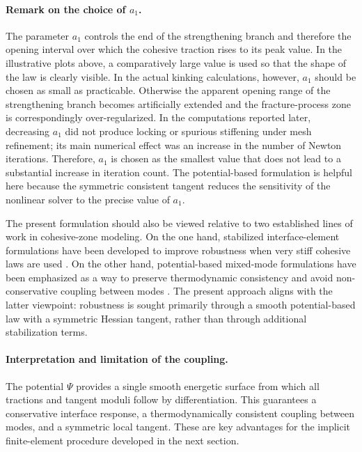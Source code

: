 \documentclass[smallextended]{svjour3}       %
\begin{document}
\paragraph{Remark on the choice of \texorpdfstring{$a_1$}{a1}.}
The parameter \(a_1\) controls the end of the strengthening branch and
therefore the opening interval over which the cohesive traction rises to its
peak value. In the illustrative plots above, a comparatively large value is
used so that the shape of the law is clearly visible. In the actual kinking
calculations, however, \(a_1\) should be chosen as small as practicable.
Otherwise the apparent opening range of the strengthening branch becomes
artificially extended and the fracture-process zone is correspondingly
over-regularized. In the computations reported later, decreasing \(a_1\) did not produce locking or spurious stiffening under mesh refinement; its main numerical effect was an increase in the number of Newton iterations. Therefore, \(a_1\) is chosen as the smallest value that does not lead to a substantial increase in iteration count. The potential-based
formulation is helpful here because the symmetric consistent tangent reduces
the sensitivity of the nonlinear solver to the precise value of \(a_1\).

The present formulation should also be viewed relative to two established
lines of work in cohesive-zone modeling. On the one hand, stabilized
interface-element formulations have been developed to improve robustness when
very stiff cohesive laws are used \cite{Ghosh2019StabilizedCZM,Ghosh2021RobustnessCZM}. On the other hand, potential-based
mixed-mode formulations have been emphasized as a way to preserve
thermodynamic consistency and avoid non-conservative coupling between modes \cite{Dimitri2014ConsistencyCZM}.
The present approach aligns with the latter viewpoint: robustness is sought
primarily through a smooth potential-based law with a symmetric Hessian
tangent, rather than through additional stabilization terms.

\paragraph{Interpretation and limitation of the coupling.}
The potential \(\Psi\) provides a single smooth energetic surface from which
all tractions and tangent moduli follow by differentiation. This guarantees a
conservative interface response, a thermodynamically consistent coupling
between modes, and a symmetric local tangent. These are key advantages for
the implicit finite-element procedure developed in the next section.
\end{document}

